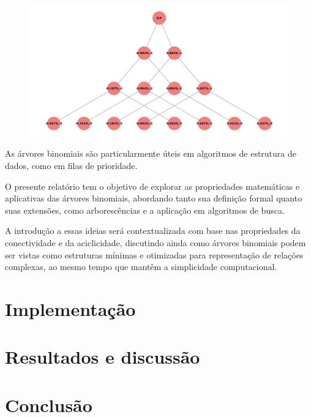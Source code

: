 \documentclass[12pt, a4paper]{scrreprt}
\begin{document}
\begin{figure}[h]
    \centering
    \includegraphics[width=.72\textwidth]{src/arvore_binomial_ordem_3.png}
    \label{fig:exemplo de árvore binomial}
\end{figure}

As árvores binomiais são particularmente úteis em algoritmos de estrutura de dados, como em filas de prioridade.

O presente relatório tem o objetivo de explorar as propriedades matemáticas e aplicativas das árvores binomiais, abordando tanto sua definição formal quanto suas extensões, como arborescências e a aplicação em algoritmos de busca.

A introdução a essas ideias será contextualizada com base nas propriedades da conectividade e da aciclicidade, discutindo ainda como árvores binomiais podem ser vistas como estruturas mínimas e otimizadas para representação de relações complexas, ao mesmo tempo que mantêm a simplicidade computacional.

\chapter{Implementação}

\chapter{Resultados e discussão}

\chapter{Conclusão}

\printbibliography %
\end{document}
